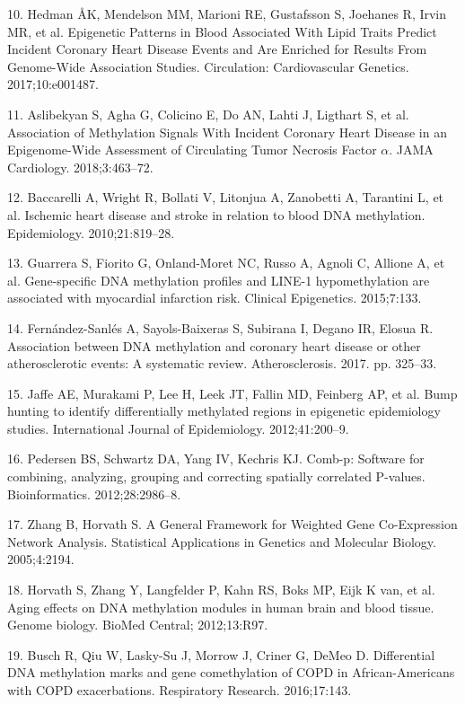 \documentclass[]{bmcart}
\begin{document}
10. Hedman ÅK, Mendelson MM, Marioni RE, Gustafsson S, Joehanes R, Irvin
MR, et al. Epigenetic Patterns in Blood Associated With Lipid Traits
Predict Incident Coronary Heart Disease Events and Are Enriched for
Results From Genome-Wide Association Studies. Circulation:
Cardiovascular Genetics. 2017;10:e001487.

11. Aslibekyan S, Agha G, Colicino E, Do AN, Lahti J, Ligthart S, et al.
Association of Methylation Signals With Incident Coronary Heart Disease
in an Epigenome-Wide Assessment of Circulating Tumor Necrosis Factor
\(\alpha\). JAMA Cardiology. 2018;3:463--72.

12. Baccarelli A, Wright R, Bollati V, Litonjua A, Zanobetti A,
Tarantini L, et al. Ischemic heart disease and stroke in relation to
blood DNA methylation. Epidemiology. 2010;21:819--28.

13. Guarrera S, Fiorito G, Onland-Moret NC, Russo A, Agnoli C, Allione
A, et al. Gene-specific DNA methylation profiles and LINE-1
hypomethylation are associated with myocardial infarction risk. Clinical
Epigenetics. 2015;7:133.

14. Fern{á}ndez-Sanl{é}s A, Sayols-Baixeras S, Subirana I, Degano IR,
Elosua R. Association between DNA methylation and coronary heart disease
or other atherosclerotic events: A systematic review. Atherosclerosis.
2017. pp. 325--33.

15. Jaffe AE, Murakami P, Lee H, Leek JT, Fallin MD, Feinberg AP, et al.
Bump hunting to identify differentially methylated regions in epigenetic
epidemiology studies. International Journal of Epidemiology.
2012;41:200--9.

16. Pedersen BS, Schwartz DA, Yang IV, Kechris KJ. Comb-p: Software for
combining, analyzing, grouping and correcting spatially correlated
P-values. Bioinformatics. 2012;28:2986--8.

17. Zhang B, Horvath S. A General Framework for Weighted Gene
Co-Expression Network Analysis. Statistical Applications in Genetics and
Molecular Biology. 2005;4:2194.

18. Horvath S, Zhang Y, Langfelder P, Kahn RS, Boks MP, Eijk K van, et
al. Aging effects on DNA methylation modules in human brain and blood
tissue. Genome biology. BioMed Central; 2012;13:R97.

19. Busch R, Qiu W, Lasky-Su J, Morrow J, Criner G, DeMeo D.
Differential DNA methylation marks and gene comethylation of COPD in
African-Americans with COPD exacerbations. Respiratory Research.
2016;17:143.
\end{document}
